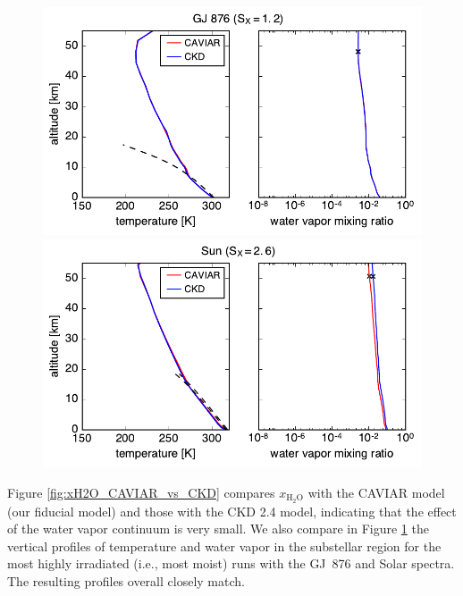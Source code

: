 \documentclass[11pt,numberedappendix,twocolappendix,]{emulateapj}
\def\water{H$_2$O}
\def\xwater{$x_\text{\water}$}
\def\revise#1{{\color{red}{#1}}}
\begin{document}
{%
\begin{figure}[!h]
    \begin{center}
    \includegraphics[width=0.9\hsize]{CAVIAR_vs_CKD_GJ876_Sx12.pdf}
    \includegraphics[width=0.9\hsize]{CAVIAR_vs_CKD_Sun_Sx26.pdf}
    \end{center}
\caption{\revise{Effect of different water vapor continuum models on the vertical profiles of temperature and water vapor mixing ratio. Upper panels: with GJ~876 spectrum and $S_X=1.2$. Lower panels: with Solar spectrum and $S_X=2.6$.}}
\label{fig:CAVIAR_vs_CKD_GJ876_Sun}
\end{figure}


%
Figure \ref{fig:xH2O_CAVIAR_vs_CKD} compares \xwater{} with the CAVIAR model (our fiducial model) and those with the CKD 2.4 model, indicating that the effect of the water vapor continuum is very small. 
%
We also compare in Figure \ref{fig:CAVIAR_vs_CKD_GJ876_Sun} the vertical profiles of temperature and water vapor in the substellar region for the most highly irradiated (i.e., most moist) runs with the GJ~876 and Solar spectra. 
The resulting profiles overall closely match. 

}
\end{document}
